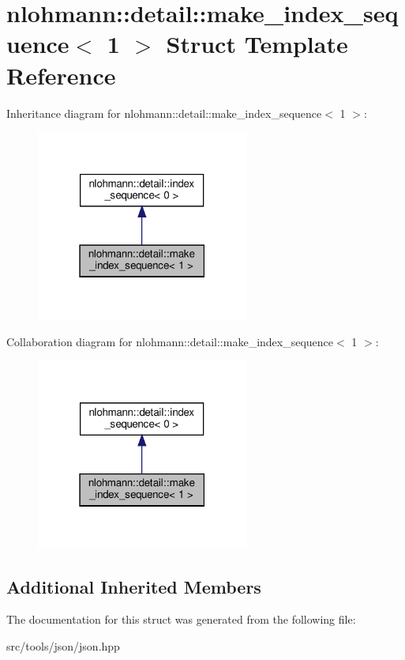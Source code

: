 \hypertarget{structnlohmann_1_1detail_1_1make__index__sequence_3_011_01_4}{}\section{nlohmann\+:\+:detail\+:\+:make\+\_\+index\+\_\+sequence$<$ 1 $>$ Struct Template Reference}
\label{structnlohmann_1_1detail_1_1make__index__sequence_3_011_01_4}


Inheritance diagram for nlohmann\+:\+:detail\+:\+:make\+\_\+index\+\_\+sequence$<$ 1 $>$\+:
\nopagebreak
\begin{figure}[H]
\begin{center}
\leavevmode
\includegraphics[width=198pt]{structnlohmann_1_1detail_1_1make__index__sequence_3_011_01_4__inherit__graph}
\end{center}
\end{figure}


Collaboration diagram for nlohmann\+:\+:detail\+:\+:make\+\_\+index\+\_\+sequence$<$ 1 $>$\+:
\nopagebreak
\begin{figure}[H]
\begin{center}
\leavevmode
\includegraphics[width=198pt]{structnlohmann_1_1detail_1_1make__index__sequence_3_011_01_4__coll__graph}
\end{center}
\end{figure}
\subsection*{Additional Inherited Members}


The documentation for this struct was generated from the following file\+:\begin{DoxyCompactItemize}
\item 
src/tools/json/json.\+hpp\end{DoxyCompactItemize}
